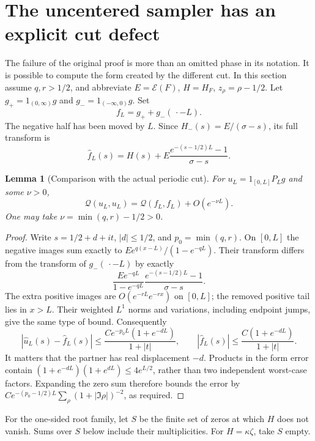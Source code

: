 \documentclass[11pt]{article}
\newtheorem{lemma}[theorem]{Lemma}
\theoremstyle{remark}
\newcommand{\Q}{\mathcal Q}
\newcommand{\E}{\mathscr E}
\begin{document}
\section{The uncentered sampler has an explicit cut defect}

The failure of the original proof is more than an omitted phase in its
notation. It is possible to compute the form created by the different cut.
In this section assume $q,r>1/2$, and abbreviate $E=\E(F)$,
$H=H_F$, $z_\rho=\rho-1/2$. Let $g_+=1_{(0,\infty)}g$ and
$g_-=1_{(-\infty,0)}g$. Set
\[
 f_L=g_++g_-(\,\cdot-L).
\]
The negative half has been moved by $L$. Since
$H_-(s)=E/(\sigma-s)$, its full transform is
\begin{equation}\label{v1:eq:cuttransform}
 \widehat f_L(s)=H(s)+
       E\frac{e^{-(s-1/2)L}-1}{\sigma-s}.
\end{equation}

\begin{lemma}[Comparison with the actual periodic cut]\label{v1:lem:uncut}
For $u_L=1_{[0,L]}P_Lg$ and some $\nu>0$,
\[
 \Q(u_L,u_L)=\Q(f_L,f_L)+O(e^{-\nu L}).
\]
One may take $\nu=\min(q,r)-1/2>0$.
\end{lemma}
\begin{proof}
Write $s=1/2+d+it$, $|d|\le1/2$, and $p_0=\min(q,r)$.
On $[0,L]$ the negative images sum exactly to
$E e^{q(x-L)}/(1-e^{-qL})$. Their transform differs from the transform
of $g_-(\,\cdot-L)$ by exactly
\[
 \frac{E e^{-qL}}{1-e^{-qL}}
       \frac{e^{-(s-1/2)L}-1}{\sigma-s}.
\]
The extra positive images are $O(e^{-rL}e^{-rx})$ on $[0,L]$; the removed
positive tail lies in $x>L$. Their weighted $L^1$ norms and variations,
including endpoint jumps, give the same type of bound. Consequently
\[
 |\widehat u_L(s)-\widehat f_L(s)|
 \le \frac{C e^{-p_0L}(1+e^{-dL})}{1+|t|},\qquad
 |\widehat f_L(s)|\le \frac{C(1+e^{-dL})}{1+|t|}.
\]
It matters that the partner has real displacement $-d$. Products in the
form error contain
$(1+e^{-dL})(1+e^{dL})\le4e^{L/2}$, rather than two independent
worst-case factors. Expanding the zero sum therefore bounds the error by
$C e^{-(p_0-1/2)L}\sum_\rho(1+|\Im\rho|)^{-2}$, as required.
\end{proof}

For the one-sided root family, let $S$ be the finite set of zeros at which
$H$ does not vanish. Sums over $S$ below include their multiplicities.
For $H=\kappa\zeta$, take $S$ empty.
\end{document}
